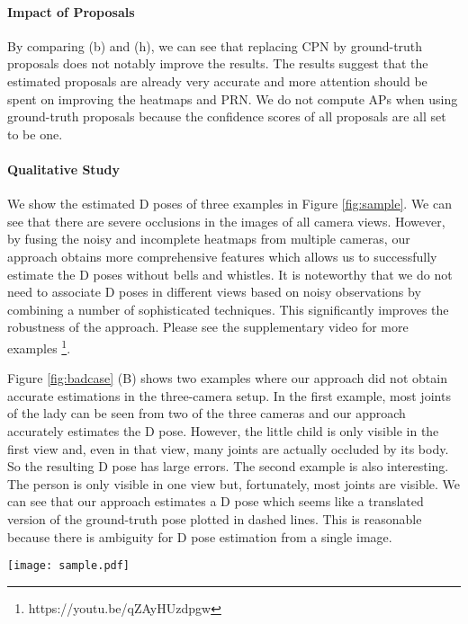 \documentclass[runningheads]{llncs}
\begin{document}
\paragraph{\textbf{Impact of Proposals}}
By comparing (b) and (h), we can see that replacing CPN by ground-truth proposals does not notably improve the results. The results suggest that the estimated proposals are already very accurate and more attention should be spent on improving the heatmaps and PRN. We do not compute APs when using ground-truth proposals because the confidence scores of all proposals are all set to be one. 


\paragraph{\textbf{Qualitative Study}}
We show the estimated D poses of three examples in Figure \ref{fig:sample}. We can see that there are severe occlusions in the images of all camera views. However, by fusing the noisy and incomplete heatmaps from multiple cameras, our approach obtains more comprehensive features which allows us to successfully estimate the D poses without bells and whistles. It is noteworthy that we do not need to associate D poses in different views based on noisy observations by combining a number of sophisticated techniques. This significantly improves the robustness of the approach. Please see the supplementary video for more examples \footnote{https://youtu.be/qZAyHUzdpgw}. 



Figure \ref{fig:badcase} (B) shows two examples where our approach did not obtain accurate estimations in the three-camera setup. In the first example, most joints of the lady can be seen from two of the three cameras and our approach accurately estimates the D pose. However, the little child is only visible in the first view and, even in that view, many joints are actually occluded by its body. So the resulting D pose has large errors. The second example is also interesting. The person is only visible in one view but, fortunately, most joints are visible. We can see that our approach estimates a D pose which seems like a translated version of the ground-truth pose plotted in dashed lines. This is reasonable because there is ambiguity for D pose estimation from a single image.

\begin{figure*}
	\centering
	\texttt{[image: sample.pdf]}
	\caption{Estimated D poses and their projections in images. The last column shows the estimated D poses.
	}
	\label{fig:sample}
\end{figure*}
\end{document}
